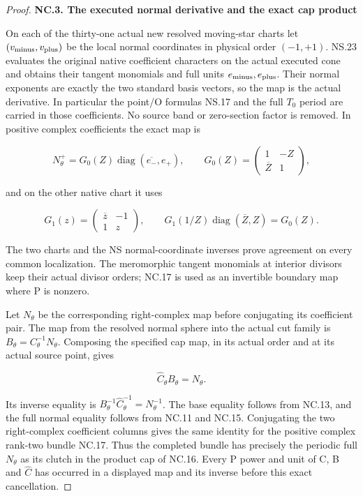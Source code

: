 \begin{proof}
\par

\medskip\noindent\textbf{NC.3. The executed normal derivative and the exact cap product}

\par\nobreak

On each of the thirty-one actual new resolved moving-star charts let
\((v_{\rm minus},v_{\rm plus})\) be the local normal coordinates in physical order
\((-1,+1)\). NS.23 evaluates the original native coefficient characters
on the actual executed cone and obtains their tangent monomials and
full units \(e_{\rm minus},e_{\rm plus}\). Their normal exponents are exactly the
two standard basis vectors, so the map is the actual derivative.
In particular the point/O formulas NS.17 and the full \(T_{0}\) period are
carried in those coefficients. No source band or zero-section factor
is removed. In positive complex coefficients the exact map is

\[
 N_\theta^+=G_0(Z)
          \operatorname{diag}(\overline{e_-},e_+),\qquad
 G_0(Z)=\begin{pmatrix}1&-Z\\\overline Z&1\end{pmatrix},
                                                        \tag{NC.17}
\]

and on the other native chart it uses

\[
 G_1(z)=\begin{pmatrix}\overline z&-1\\1&z\end{pmatrix},
 \qquad G_1(1/Z)\operatorname{diag}(\overline Z,Z)=G_0(Z).
                                                        \tag{NC.18}
\]

The two charts and the NS normal-coordinate inverses prove agreement
on every common localization. The meromorphic tangent monomials at
interior divisors keep their actual divisor orders; NC.17 is used as
an invertible boundary map where P is nonzero.

Let \(N_\theta\) be the corresponding right-complex map before conjugating
its coefficient pair. The map from the resolved normal sphere into
the actual cut family is \(B_\theta=C_\theta^{-1} N_\theta\). Composing the
specified cap map, in its actual order and at its actual source point,
gives

\[
                     \widehat C_\theta B_\theta=N_\theta.
                                                        \tag{NC.19}
\]

Its inverse equality is \(B_\theta^{-1} \widehat C_\theta^{-1}=N_\theta^{-1}\). The
base equality follows from NC.13, and the full normal equality
follows from NC.11 and NC.15. Conjugating the two right-complex
coefficient columns gives the same identity for the positive complex
rank-two bundle NC.17. Thus the completed bundle has precisely the
periodic full \(N_\theta\) as its clutch in the product cap of NC.16.
Every P power and unit of C, B and \(\widehat C\) has occurred in a displayed
map and its inverse before this exact cancellation.


\end{proof}
